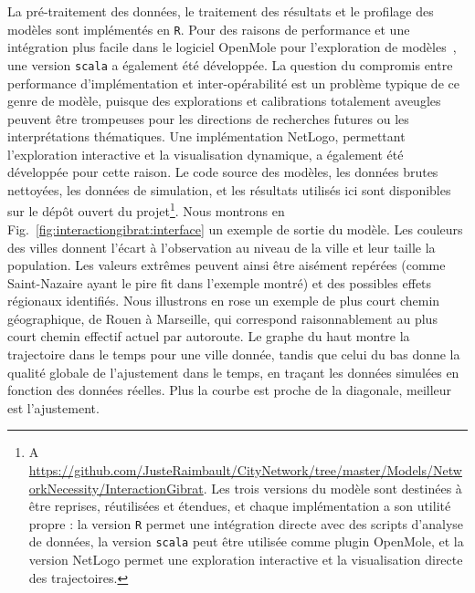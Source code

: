 {La pré-traitement des données, le traitement des résultats et le profilage des modèles sont implémentés en \texttt{R}. Pour des raisons de performance et une intégration plus facile dans le logiciel OpenMole pour l'exploration de modèles~\cite{reuillon2013openmole}, une version \texttt{scala} a également été développée. La question du compromis entre performance d'implémentation et inter-opérabilité est un problème typique de ce genre de modèle, puisque des explorations et calibrations totalement aveugles peuvent être trompeuses pour les directions de recherches futures ou les interprétations thématiques. Une implémentation NetLogo, permettant l'exploration interactive et la visualisation dynamique, a également été développée pour cette raison. Le code source des modèles, les données brutes nettoyées, les données de simulation, et les résultats utilisés ici sont disponibles sur le dépôt ouvert du projet\footnote{A \url{https://github.com/JusteRaimbault/CityNetwork/tree/master/Models/NetworkNecessity/InteractionGibrat}. Les trois versions du modèle sont destinées à être reprises, réutilisées et étendues, et chaque implémentation a son utilité propre : la version \texttt{R} permet une intégration directe avec des scripts d'analyse de données, la version \texttt{scala} peut être utilisée comme plugin OpenMole, et la version NetLogo permet une exploration interactive et la visualisation directe des trajectoires.}. Nous montrons en Fig.~\ref{fig:interactiongibrat:interface} un exemple de sortie du modèle. Les couleurs des villes donnent l'écart à l'observation au niveau de la ville et leur taille la population. Les valeurs extrêmes peuvent ainsi être aisément repérées (comme Saint-Nazaire ayant le pire fit dans l'exemple montré) et des possibles effets régionaux identifiés. Nous illustrons en rose un exemple de plus court chemin géographique, de Rouen à Marseille, qui correspond raisonnablement au plus court chemin effectif actuel par autoroute. Le graphe du haut montre la trajectoire dans le temps pour une ville donnée, tandis que celui du bas donne la qualité globale de l'ajustement dans le temps, en traçant les données simulées en fonction des données réelles. Plus la courbe est proche de la diagonale, meilleur est l'ajustement.
}

